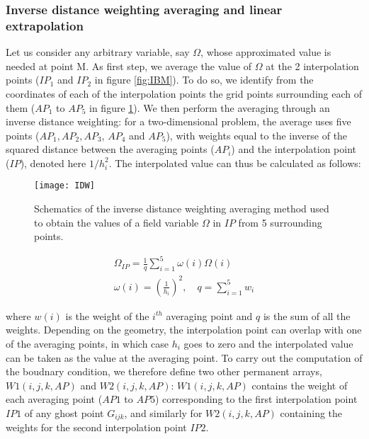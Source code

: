 \documentclass[review]{elsarticle}
\begin{document}
\subsubsection{Inverse distance weighting averaging and linear extrapolation} \label{InvDisAve}
Let us consider any arbitrary variable, say $\Omega$, whose approximated value is needed at point M. 
As first step, we average the value of $\Omega$ at the 2 interpolation points ($IP_1$ and $IP_2$ in figure \ref{fig:IBM}).  To do so,
 we identify from the coordinates of each of the interpolation points the grid points surrounding each of them ($AP_1$ to $AP_5$ in figure \ref{fig:IDW}).
 We then perform the averaging through an inverse distance weighting: for a two-dimensional problem, the average uses five points ($AP_1, AP_2, AP_3$, $AP_4$ and $AP_5$), with %
weights equal to the inverse of the squared distance between the  averaging points ($AP_i$) and the interpolation point ($IP$), denoted here $1/h_i^2$.   The interpolated value can thus be calculated as follows:
\begin{figure}[ H]
\begin{center}
\texttt{[image: IDW]}
\caption{Schematics of the inverse distance weighting averaging method used to obtain the values of a field variable $\Omega$  in $IP$ from 5 surrounding points.}
\label{fig:IDW}
\end{center}
\end{figure}
 \begin{linenomath}\begin{equation} \label{weright averaged} 
\begin{gathered}
\Omega_{IP} = \frac{1}{q} \sum_{i=1}^5 \omega(i)\Omega(i)\\
\omega(i) =  \left(\frac{1}{h_i}\right)^2, \quad q = \sum_{i=1}^5 w_i
\end{gathered}
\end{equation}\end{linenomath}
where $w(i)$ is the weight of the $i^{th}$ averaging point and $q$ is the sum of all the weights. Depending on the geometry, the interpolation point can overlap with one of the averaging points, in which case $h_i$ goes to zero and  the interpolated value  can be taken as the value  at the averaging point. To carry out the computation of the boudnary condition, we therefore define two other permanent arrays, $W1(i,j,k,AP)$ and $W2(i,j,k,AP)$: $W1(i,j,k,AP)$ contains the weight of each averaging point ($AP1$ to $AP5$) corresponding to the first interpolation point $IP1$ of any ghost point $G_{ijk}$, and similarly for $W2(i,j,k,AP)$ containing the weights for the second interpolation point  $IP2$.
\end{document}
